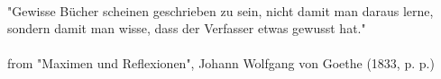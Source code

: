 \ \vfill 
\begin{center}
"Gewisse B\"ucher scheinen geschrieben zu sein, nicht damit man daraus lerne, sondern damit man wisse, dass der Verfasser etwas gewusst hat." \\ \hfill \\ from "Maximen und Reflexionen", Johann Wolfgang von Goethe (1833, p. p.) 
\end{center}
\ \vfill